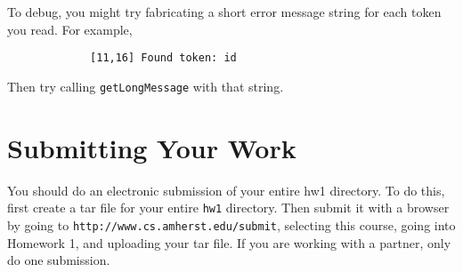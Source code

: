 \documentclass[11pt]{article}
\begin{document}
To debug, you might try fabricating a short error message string for each token you read.  For example,
\begin{verbatim}
      	     [11,16] Found token: id
\end{verbatim}
Then try calling {\tt getLongMessage} with that string.

\section{Submitting Your Work}
You should do an electronic submission of your entire hw1 directory. To do this, first create a tar file for your entire {\tt hw1} directory.  Then submit it with a browser by going to \verb'http://www.cs.amherst.edu/submit', selecting this course, going into Homework 1, and uploading your tar file.  If you are working with a partner, only do one submission.
\end{document}
